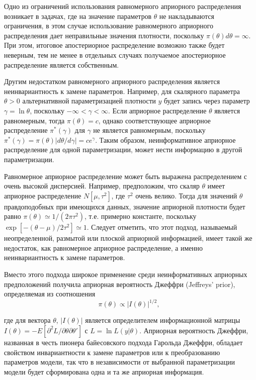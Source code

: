Одно из ограничений использования равномерного априорного распределения возникает в задачах, где на значение параметров $\theta$ не накладываются ограничения, в этом случае использование равномерного априорного распределения дает неправильные значения плотности, поскольку $\pi(\theta)d\theta=\infty$. При этом, итоговое апостериорное распределение возможно также будет неверным, тем не менее в отдельных случаях получаемое апостериорное распределение является собственным.

Другим недостатком равномерного априорного распределения является неинвариантность к замене параметров. Например, для скалярного параметра $\theta>0$ альтернативной параметризацией плотности $y$ будет запись через параметр $\gamma=\ln {\theta}$, поскольку $-\infty<\gamma<\infty$. Если априорное распределение $\theta$ является равномерным, тогда $\pi(\theta)=c$, однако соответствующее априорное распределение $\pi^{*}(\gamma)$ для $\gamma$ не является равномерным, поскольку $\pi^{*}(\gamma)=\pi(\theta)|d\theta/d\gamma|=ce^{\gamma}$. Таким образом, неинформативное априорное распределение для одной параметризации, может нести информацию в другой параметризации.

Равномерное априорное распределение может быть выражена распределением с очень высокой дисперсией. Например, предположим, что скаляр $\theta$ имеет априорное распределение $N[\mu,\tau^{2}]$, где $\tau^{2}$ очень велико. Тогда для значений $\theta$ правдоподобных при имеющихся данных, значение априорной плотности будет равно $\pi(\theta){\simeq}1/(2\pi\tau^{2})$, т.е. примерно константе, поскольку $\exp[-(\theta-\mu)/2\tau^{2}]{\simeq}1$. Следует отметить, что этот подход, называемый неопределенной, размытой или плоской априорной информацией, имеет такой же недостаток, как равномерное априорное распределение, а именно неинвариантность к замене параметров.

Вместо этого подхода широкое применение среди неинформативных априорных предположений получила априорная вероятность Джеффри (Jeffreys' prior), определяемая из соотношения
\begin{equation}
\pi(\theta)\propto|I(\theta)|^{1/2},
\end{equation}

где для вектора $\theta$, $|I(\theta)|$ является определителем информационной матрицы $I(\theta)=-E[\partial^{2}L/\partial\theta\partial\theta']$ с $L=\ln {L(y|\theta)}$. Априорная вероятность Джеффри, названная в честь пионера байесовского подхода Гарольда Джеффри, обладает свойством инвариантности к замене параметров или к преобразованию параметров модели, так что в независимости от выбранной параметризации модели будет сформирована одна и та же априорная информация.

